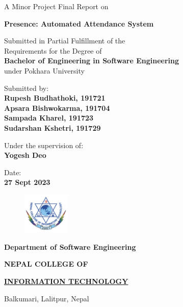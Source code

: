 \documentclass[12pt]{article}
\begin{document}
\begin{titlepage}
	\begin{center}
	
	\large%
	A Minor Project Final Report on
	
	\huge %
	\textbf{Presence: Automated Attendance System}

	\vfill
	
	\large %
	Submitted in Partial Fulfillment of the \\ 
	Requirements for the Degree of \\ 
	\textbf {Bachelor of Engineering in Software Engineering} \\
	under Pokhara University
	
	\vfill
	
	Submitted by: \\ 
	\textbf {Rupesh Budhathoki, 191721} \\
	\textbf {Apsara Bishwokarma, 191704} \\
	\textbf {Sampada Kharel, 191723} \\
	\textbf {Sudarshan Kshetri, 191729} \\
 
	\vfill
	
	Under the supervision of: \\
	\textbf {Yogesh Deo}
	
	\vfill
	
	Date: \\
	\textbf {27 Sept 2023}
	
	\vfill
	
	\end{center}
	
	\begin{figure}
	\centering
	\includegraphics[width=0.2\textwidth]{figures/college-logo.png}
	\end{figure}
	
	\selectfont
	
	\textbf {Department of Software Engineering}  
	
        \LARGE %
	\textbf {NEPAL COLLEGE OF} 
	
	\LARGE %
	\textbf {\underline {INFORMATION TECHNOLOGY} }
	
	\small %
	Balkumari, Lalitpur, Nepal
	
	
\end{titlepage}
\end{document}
